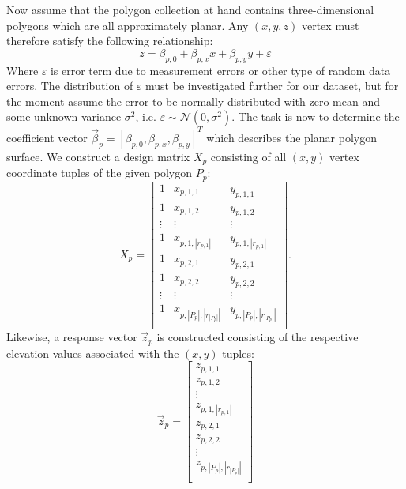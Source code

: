 Now assume that the polygon collection at hand contains three-dimensional polygons which are all approximately planar.
Any $(x, y, z)$ vertex must therefore satisfy the following relationship:
%
\begin{equation*}
  z = \beta_{p,0} + \beta_{p,x} x + \beta_{p,y} y + \varepsilon
\end{equation*}
%
Where $\varepsilon$ is error term due to measurement errors or other type of random data errors.
The distribution of $\varepsilon$ must be investigated further for our dataset, but for the moment assume the error to be normally distributed with zero mean and some unknown variance $\sigma^2$, i.e. $\varepsilon \sim \mathcal{N}(0, \sigma^2)$.
%
The task is now to determine the coefficient vector $\vec{\beta}_p = {[\beta_{p,0}, \beta_{p,x}, \beta_{p,y}]}^T$ which describes the planar polygon surface.
We construct a design matrix $X_p$ consisting of all $(x, y)$ vertex coordinate tuples of the given polygon $P_p$:
%
\begin{equation*}
  X_p
  =
  \begin{bmatrix}
    1 & x_{p,1,1} & y_{p,1,1} \\
    1 & x_{p,1,2} & y_{p,1,2} \\
    \vdots & \vdots & \vdots \\
    1 & x_{p,1,|r_{p,1}|} & y_{p,1,|r_{p,1}|} \\
    1 & x_{p,2,1} & y_{p,2,1} \\
    1 & x_{p,2,2} & y_{p,2,2} \\
    \vdots & \vdots & \vdots \\
    1 & x_{p,|P_p|,|r_{|P_p|}|} & y_{p,|P_p|,|r_{|P_p|}|} \\
  \end{bmatrix}.
\end{equation*}
%
Likewise, a response vector $\vec{z}_p$ is constructed consisting of the respective elevation values associated with the $(x, y)$ tuples:
%
\begin{equation*}
  \vec{z}_p
  =
  \begin{bmatrix}
     z_{p,1,1} \\
     z_{p,1,2} \\
     \vdots \\
     z_{p,1,|r_{p,1}|} \\
     z_{p,2,1} \\
     z_{p,2,2} \\
     \vdots \\
     z_{p,|P_p|,|r_{|P_p|}|} \\
  \end{bmatrix}
\end{equation*}
